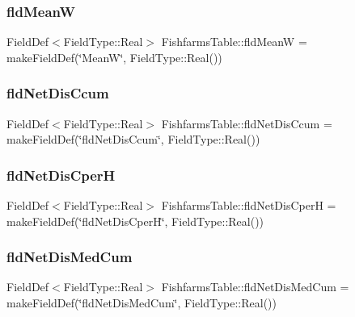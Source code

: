 \mbox{\label{class_fishfarms_table_a2b69aea64e8ab7150d6ceb922a671e72}} 
\subsubsection{\texorpdfstring{fldMeanW}{fldMeanW}}
{\footnotesize\ttfamily Field\+Def$<$Field\+Type\+::\+Real$>$ Fishfarms\+Table\+::fld\+MeanW = make\+Field\+Def(\char`\"{}MeanW\char`\"{}, Field\+Type\+::\+Real())}

\mbox{\label{class_fishfarms_table_ae3d67ede322567aa13dc331b274e0a91}} 
\subsubsection{\texorpdfstring{fldNetDisCcum}{fldNetDisCcum}}
{\footnotesize\ttfamily Field\+Def$<$Field\+Type\+::\+Real$>$ Fishfarms\+Table\+::fld\+Net\+Dis\+Ccum = make\+Field\+Def(\char`\"{}fld\+Net\+Dis\+Ccum\char`\"{}, Field\+Type\+::\+Real())}

\mbox{\label{class_fishfarms_table_ac37af2dd869cf9440630ece77aa9b4ad}} 
\subsubsection{\texorpdfstring{fldNetDisCperH}{fldNetDisCperH}}
{\footnotesize\ttfamily Field\+Def$<$Field\+Type\+::\+Real$>$ Fishfarms\+Table\+::fld\+Net\+Dis\+CperH = make\+Field\+Def(\char`\"{}fld\+Net\+Dis\+CperH\char`\"{}, Field\+Type\+::\+Real())}

\mbox{\label{class_fishfarms_table_aa6ee1fbbc9f0017dccf1ef8d4d58764f}} 
\subsubsection{\texorpdfstring{fldNetDisMedCum}{fldNetDisMedCum}}
{\footnotesize\ttfamily Field\+Def$<$Field\+Type\+::\+Real$>$ Fishfarms\+Table\+::fld\+Net\+Dis\+Med\+Cum = make\+Field\+Def(\char`\"{}fld\+Net\+Dis\+Med\+Cum\char`\"{}, Field\+Type\+::\+Real())}

